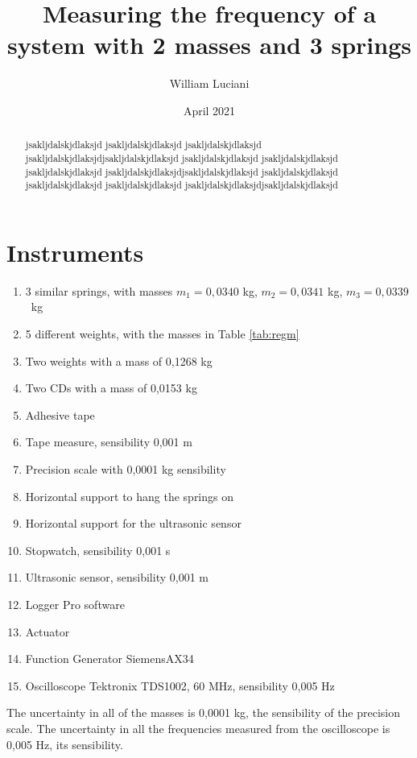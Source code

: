\documentclass{article}
\title{ Measuring the frequency  of a system with 2 masses and 3 springs}
\author{William Luciani}
\date{April 2021}
\begin{document}
\maketitle

\begin{abstract}
    jsakljdalskjdlaksjd jsakljdalskjdlaksjd jsakljdalskjdlaksjd jsakljdalskjdlaksjdjsakljdalskjdlaksjd
    jsakljdalskjdlaksjd jsakljdalskjdlaksjd jsakljdalskjdlaksjd jsakljdalskjdlaksjdjsakljdalskjdlaksjd
    jsakljdalskjdlaksjd jsakljdalskjdlaksjd jsakljdalskjdlaksjd jsakljdalskjdlaksjdjsakljdalskjdlaksjd
\end{abstract}

\section{Instruments} \label{sec:instr}
\begin{enumerate}
    \item 3 similar springs, with masses $m_1 = 0,0340$ kg, $m_2 = 0,0341$ kg, \hbox{$m_3 = 0,0339$ kg}
    \item 5 different weights, with the masses in Table \ref{tab:regm}
    \item Two weights with a mass of 0,1268 kg
    \item Two CDs with a mass of 0,0153 kg          %
    \item Adhesive tape
    \item Tape measure, sensibility 0,001 m
    \item Precision scale with 0,0001 kg sensibility
    \item Horizontal support to hang the springs on
    \item Horizontal support for the ultrasonic sensor
    \item Stopwatch, sensibility 0,001 s
    \item Ultrasonic sensor, sensibility 0,001 m
    \item Logger Pro software
    \item Actuator
    \item Function Generator SiemensAX34
    \item Oscilloscope Tektronix TDS1002, 60 MHz, sensibility 0,005 Hz
\end{enumerate}
The uncertainty in all of the masses is 0,0001 kg, the sensibility of the precision scale. The uncertainty in all the frequencies measured from the oscilloscope is 0,005 Hz, its sensibility.
\end{document}
